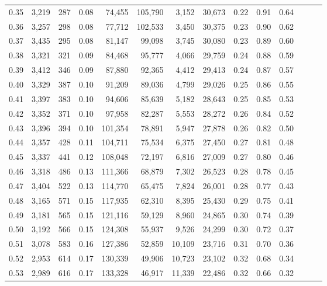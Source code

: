 \begin{tabular}{rrrrrrrrrrrrrr}
0.35 &  3,219 &  287 &  0.08 &   74,455 &  105,790 &   3,152 &  30,673 &  0.22 &  0.91 &      0.64 \\
0.36 &  3,257 &  298 &  0.08 &   77,712 &  102,533 &   3,450 &  30,375 &  0.23 &  0.90 &      0.62 \\
0.37 &  3,435 &  295 &  0.08 &   81,147 &   99,098 &   3,745 &  30,080 &  0.23 &  0.89 &      0.60 \\
0.38 &  3,321 &  321 &  0.09 &   84,468 &   95,777 &   4,066 &  29,759 &  0.24 &  0.88 &      0.59 \\
0.39 &  3,412 &  346 &  0.09 &   87,880 &   92,365 &   4,412 &  29,413 &  0.24 &  0.87 &      0.57 \\
0.40 &  3,329 &  387 &  0.10 &   91,209 &   89,036 &   4,799 &  29,026 &  0.25 &  0.86 &      0.55 \\
0.41 &  3,397 &  383 &  0.10 &   94,606 &   85,639 &   5,182 &  28,643 &  0.25 &  0.85 &      0.53 \\
0.42 &  3,352 &  371 &  0.10 &   97,958 &   82,287 &   5,553 &  28,272 &  0.26 &  0.84 &      0.52 \\
0.43 &  3,396 &  394 &  0.10 &  101,354 &   78,891 &   5,947 &  27,878 &  0.26 &  0.82 &      0.50 \\
0.44 &  3,357 &  428 &  0.11 &  104,711 &   75,534 &   6,375 &  27,450 &  0.27 &  0.81 &      0.48 \\
0.45 &  3,337 &  441 &  0.12 &  108,048 &   72,197 &   6,816 &  27,009 &  0.27 &  0.80 &      0.46 \\
0.46 &  3,318 &  486 &  0.13 &  111,366 &   68,879 &   7,302 &  26,523 &  0.28 &  0.78 &      0.45 \\
0.47 &  3,404 &  522 &  0.13 &  114,770 &   65,475 &   7,824 &  26,001 &  0.28 &  0.77 &      0.43 \\
0.48 &  3,165 &  571 &  0.15 &  117,935 &   62,310 &   8,395 &  25,430 &  0.29 &  0.75 &      0.41 \\
0.49 &  3,181 &  565 &  0.15 &  121,116 &   59,129 &   8,960 &  24,865 &  0.30 &  0.74 &      0.39 \\
0.50 &  3,192 &  566 &  0.15 &  124,308 &   55,937 &   9,526 &  24,299 &  0.30 &  0.72 &      0.37 \\
0.51 &  3,078 &  583 &  0.16 &  127,386 &   52,859 &  10,109 &  23,716 &  0.31 &  0.70 &      0.36 \\
0.52 &  2,953 &  614 &  0.17 &  130,339 &   49,906 &  10,723 &  23,102 &  0.32 &  0.68 &      0.34 \\
0.53 &  2,989 &  616 &  0.17 &  133,328 &   46,917 &  11,339 &  22,486 &  0.32 &  0.66 &      0.32 \\

\end{tabular}
